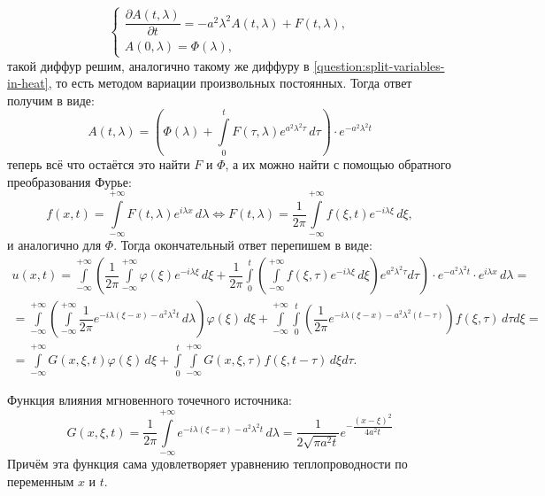 \[
  \begin{cases}
    \dfrac{\partial A(t, \lambda)}{\partial t}
      = - a^2 \lambda^2 A(t, \lambda)
      + F(t, \lambda), \\
    A(0, \lambda) = \Phi(\lambda),
  \end{cases}
\]
такой диффур решим, аналогично такому же диффуру в \ref{question:split-variables-in-heat}, то
есть методом вариации произвольных постоянных. Тогда ответ получим в виде:
\[
  A(t, \lambda) = \left(
    \Phi(\lambda)
    + \int\limits_0^t F(\tau, \lambda) e^{a^2 \lambda^2 \tau} \, d\tau \right)
    \cdot e^{- a^2 \lambda^2 t}
\]
теперь всё что остаётся это найти $F$ и $\Phi$, а их можно найти с помощью обратного преобразования
Фурье:
\[
  f(x, t) = \int\limits_{-\infty}^{+\infty} F(t, \lambda) e^{i \lambda x} \, d\lambda
  \Leftrightarrow
  F(t, \lambda)
  = \dfrac{1}{2\pi} \int\limits_{-\infty}^{+\infty} f(\xi, t) e^{-i \lambda \xi} \, d\xi,
\]
и аналогично для $\Phi$. Тогда окончательный ответ перепишем в виде:
\begin{multline*}
  u(x, t) = \int\limits_{-\infty}^{+\infty}
    \left( \dfrac{1}{2\pi} \int\limits_{-\infty}^{+\infty} \varphi(\xi) e^{-i \lambda \xi} \, d\xi
      + \dfrac{1}{2\pi} \int\limits_0^t
      \left( \int\limits_{-\infty}^{+\infty} f(\xi, \tau) e^{-i \lambda \xi} \, d\xi \right)
      e^{a^2 \lambda^2 \tau} d\tau \right)
    \cdot e^{-a^2 \lambda^2 t} \cdot e^{i \lambda x} \, d\lambda = \\
  = \int\limits_{-\infty}^{+\infty}
    \left( \int\limits_{-\infty}^{+\infty}
      \dfrac{1}{2\pi} e^{-i\lambda (\xi-x) - a^2\lambda^2t} \, d\lambda \right) \varphi(\xi) \, d\xi
  + \int\limits_{-\infty}^{+\infty} \int\limits_{0}^{t}
    \left( \dfrac{1}{2\pi} e^{-i\lambda(\xi-x) - a^2\lambda^2(t - \tau)} \right)
    f(\xi, \tau) \, d\tau d\xi = \\
  = \int\limits_{-\infty}^{+\infty} G(x, \xi, t) \varphi(\xi) \, d\xi
    + \int\limits_0^t \int\limits_{-\infty}^{+\infty} G(x, \xi, \tau) f(\xi, t-\tau) \, d\xi d\tau.
\end{multline*}

Функция влияния мгновенного точечного источника:
\[
  G(x, \xi, t) = \dfrac{1}{2\pi} \int\limits_{-\infty}^{+\infty} e^{-i \lambda(\xi-x) - a^2 \lambda^2 t} \, d\lambda
  = \dfrac{1}{2\sqrt{\pi a^2 t}} e^{- \dfrac{(x-\xi)^2}{4 a^2 t}}
\]
Причём эта функция сама удовлетворяет уравнению теплопроводности по переменным $x$ и $t$.

